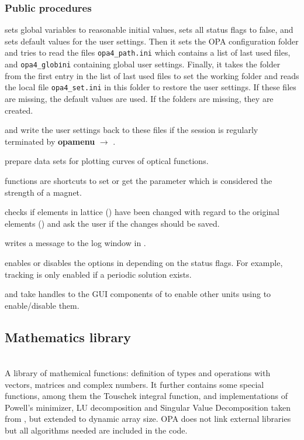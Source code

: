 \documentclass[12pt]{article}
\newcommand\code[1]{{\tt #1}}
\newcommand{\ofld}[1]{\colorbox{black!15}{{{\color{black}\bf #1}}}}
\newcommand\guico[1]{{\color{blue}\code{#1}}}
\newcommand{\unico}[1]{{\color{burntorange}\code{#1}}}
\newcommand{\evcod}[2]{\ofld{#1} $\rightarrow$ \guico{#2}}
\newcommand{\opagui}[1]{\colorbox{blue!20}{{\color{black}\code{#1}}}}
\newcommand{\ogui}[1]{\hyperref[#1]{\opagui{#1}}}
\newcommand{\opauni}[1]{\colorbox{orange!30}{{\color{black}\code{#1}}}}
\newcommand{\ounih}[2]{\subsection{\label{#2}#1}{\Huge\opauni{#2}}\\}
\newcommand{\ouni}[1]{\hyperref[#1]{\opauni{#1}}}
\newcommand{\desc}[1]{#1}
\newcommand{\ppro}[1]{\subsubsection*{Public procedures} #1}
\begin{document}
\ppro{

\unico{Initialization} sets global variables to reasonable initial values, sets all status flags to false, and sets default values for the user settings.
Then it sets the OPA configuration folder and tries to read the files \code{opa4\_path.ini} which contains a list of last used files, and \code{opa4\_glob\.ini} containing global user settings. Finally, it takes the folder from the first entry in the list of last used files to set the working folder and reads the local file \code{opa4\_set.ini} in this folder to restore the user settings. If these files are missing, the default values are used. If the folders are missing, they are created.

\unico{GlobDefWriteFile} and \unico{DefWriteFile} write the user settings back to these files if the session is regularly terminated by \evcod{opamenu}{ExitOPA}.

\unico{AppendCurve, ClearCurve}  prepare data sets for plotting curves of optical functions. 

\unico{putkval, getkval, putSexkval, getSexkval} functions are shortcuts to set or get the parameter which is considered the strength of a magnet.

\unico{EllaSave} checks if elements in lattice (\unico{Ella}) have been changed with regard to the original elements (\unico{Elem}) and ask the user if the changes should be saved.

\unico{OPALog} writes a message to the log window in \ogui{opamenu}.

\unico{MainButtonEnable} enables or disables the options in \ogui{opamenu} depending on the status flags. For example, tracking is only enabled if a periodic solution exists.

\unico{PassMainButtonHandles} and \unico{passErrLogHandle} take handles to the GUI components of \ogui{opamenu} to enable other units using \ouni{globlib} to enable/disable them.
}





\ounih{Mathematics library}{mathlib}

\desc{
A library of mathemical functions: definition of types and operations with vectors, matrices and complex numbers. It further contains some special functions, among them the Touschek integral function, and implementations of Powell's minimizer, LU decomposition and Singular Value Decomposition taken from \cite{numrec}, but extended to dynamic array size. OPA does not link external libraries but all algorithms needed are included in the code.}
\end{document}
